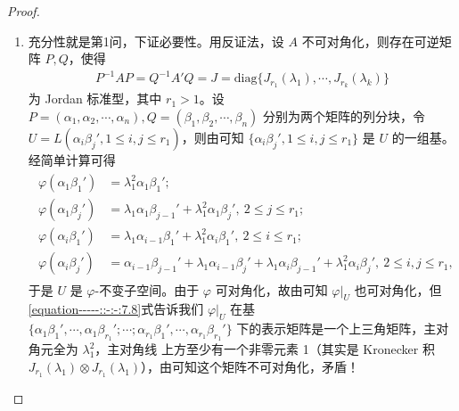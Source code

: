 \documentclass[../../main.tex]{subfiles}
\begin{document}
\begin{proof}
\begin{enumerate}
\item 充分性就是第1问，下证必要性。用反证法，设 $A$ 不可对角化，则存在可逆矩阵 $P,Q$，使得
\begin{align*}
P^{-1}AP = Q^{-1}A'Q = J = \mathrm{diag}\{J_{r_1}(\lambda_1),\cdots,J_{r_k}(\lambda_k)\}
\end{align*}
为 Jordan 标准型，其中 $r_1 > 1$。设 $P = (\alpha_1,\alpha_2,\cdots,\alpha_n),Q = (\beta_1,\beta_2,\cdots,\beta_n)$ 分别为两个矩阵的列分块，令 $U = L(\alpha_i\beta_j',1\leq i,j\leq r_1)$，则由可知 $\{\alpha_i\beta_j',1\leq i,j\leq r_1\}$ 是 $U$ 的一组基。经简单计算可得
\begin{gather}\label{equation-----::-:-:7.8}
\begin{aligned}
\varphi(\alpha_1\beta_1')&=\lambda_1^2\alpha_1\beta_1';\\
\varphi(\alpha_1\beta_j')&=\lambda_1\alpha_1\beta_{j - 1}' + \lambda_1^2\alpha_1\beta_j',\ 2\leq j\leq r_1;\\
\varphi(\alpha_i\beta_1')&=\lambda_1\alpha_{i - 1}\beta_1' + \lambda_1^2\alpha_i\beta_1',\ 2\leq i\leq r_1;\\
\varphi(\alpha_i\beta_j')&=\alpha_{i - 1}\beta_{j - 1}' + \lambda_1\alpha_{i - 1}\beta_j' + \lambda_1\alpha_i\beta_{j - 1}' + \lambda_1^2\alpha_i\beta_j',\ 2\leq i,j\leq r_1,
\end{aligned}
\end{gather}
于是 $U$ 是 $\varphi$-不变子空间。由于 $\varphi$ 可对角化，故由可知 $\varphi|_U$ 也可对角化，但\eqref{equation-----::-:-:7.8}式告诉我们 $\varphi|_U$ 在基 $\{\alpha_1\beta_1',\cdots,\alpha_1\beta_{r_1}';\cdots;\alpha_{r_1}\beta_1',\cdots,\alpha_{r_1}\beta_{r_1}'\}$ 下的表示矩阵是一个上三角矩阵，主对角元全为 $\lambda_1^2$，主对角线 上方至少有一个非零元素 1（其实是 Kronecker 积 $J_{r_1}(\lambda_1)\otimes J_{r_1}(\lambda_1)$），由可知这个矩阵不可对角化，矛盾！
\end{enumerate}
\end{proof}
\end{document}
